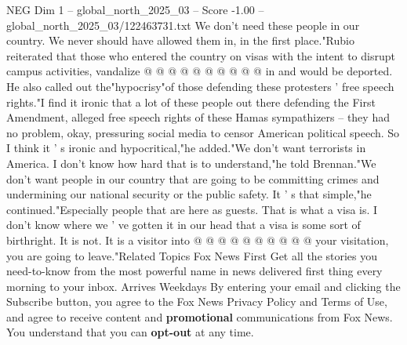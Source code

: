 \begin{textsample}{NEG Dim 1 – global\_north\_2025\_03 – Score -1.00 – global\_north\_2025\_03/122463731.txt}
We don't need these people in our country.
We never should have allowed them in, in the first place."Rubio reiterated that those who entered the country on visas with the intent to disrupt campus activities, vandalize @ @ @ @ @ @ @ @ @ @ in and would be deported.
He also called out the"hypocrisy"of those defending these protesters ' free speech rights."I find it ironic that a lot of these people out there defending the First Amendment, alleged free speech rights of these Hamas sympathizers -- they had no problem, okay, pressuring social media to censor American political speech.
So I think it ' s ironic and hypocritical,"he added."We don't want terrorists in America.
I don't know how hard that is to understand,"he told Brennan."We don't want people in our country that are going to be committing crimes and undermining our national security or the public safety.
It ' s that simple,"he continued."Especially people that are here as guests.
That is what a visa is.
I don't know where we ' ve gotten it in our head that a visa is some sort of birthright.
It is not.
It is a visitor into @ @ @ @ @ @ @ @ @ @ your visitation, you are going to leave."Related Topics Fox News First Get all the stories you need-to-know from the most powerful name in news delivered first thing every morning to your inbox.
Arrives Weekdays By entering your email and clicking the Subscribe button, you agree to the Fox News Privacy Policy and Terms of Use, and agree to receive content and \textbf{promotional} communications from Fox News.
You understand that you can \textbf{opt-out} at any time.

\end{textsample}
